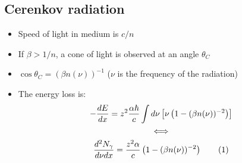 \documentclass[11pt]{article}
\newcommand\numberthis{\addtocounter{equation}{1}\tag{\theequation}}
\newcommand{\dd}[2]{\dfrac{d #1}{d #2}}
\newcommand{\inv}{^{-1}}
\begin{document}
\subsection{Cerenkov radiation}
\begin{itemize}
  \item Speed of light in medium is $c/n$
  \item If $\beta>1/n$, a cone of light is observed at an angle $\theta_C$
  \item $\cos\theta_C = (\beta n(\nu))\inv$ ($\nu$ is the frequency of the radiation)
  \item The energy loss is:
  \begin{gather*}
    - \dd{E}{x} = z^2 \frac{\alpha \hbar}{c} \int d\nu \left[\nu \left(1-(\beta n(\nu))^{-2}\right) \right]\\
    \Longleftrightarrow \\
    \frac{d^2N_\gamma}{d\nu dx} = \frac{z^2\alpha}{c}\left(1-(\beta n(\nu))^{-2}\right) \numberthis
  \end{gather*}
\end{itemize}
\end{document}
